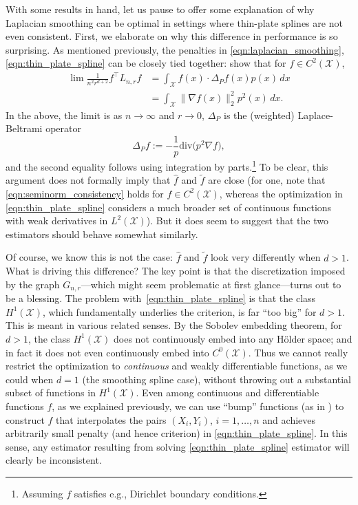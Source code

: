 \documentclass[twoside]{article}
\newcommand{\1}{\mathbf{1}}
\newcommand{\Lap}{L}
\newcommand{\Xset}{\mathcal{X}}
\newcommand{\Leb}{L}
\newcommand{\dive}{\mathrm{div}}
\newcommand{\wt}[1]{\widetilde{#1}}
\newcommand{\wh}[1]{\widehat{#1}}
\theoremstyle{definition}
\theoremstyle{remark}
\begin{document}
With some results in hand, let us pause to offer some explanation of why Laplacian smoothing can be optimal in settings where thin-plate splines are not even consistent. First, we elaborate on why this difference in performance is so surprising. As mentioned previously, the penalties in \eqref{eqn:laplacian_smoothing}, \eqref{eqn:thin_plate_spline} can be closely tied together: \citet{bousquet03} show that for $f \in C^2(\Xset)$, 
\begin{equation}
\label{eqn:seminorm_consistency}
\begin{aligned}
\lim \frac{1}{n^2 r^{d + 2}} f^\top \Lap_{n,r} f & = \int_{\Xset} f(x) \cdot \Delta_Pf(x) p(x) \,dx \\
& = \int_{\Xset} \|\nabla f(x)\|_2^2 p^2(x) \,dx.
\end{aligned}
\end{equation}
In the above, the limit is as $n \to \infty$ and $r \to 0$, $\Delta_P$ is the (weighted) Laplace-Beltrami operator
\begin{equation*}
\Delta_Pf := -\frac{1}{p} \dive\bigl(p^2\nabla f),
\end{equation*}
and the second equality follows using integration by parts.\footnote{Assuming $f$ satisfies e.g., Dirichlet boundary conditions.} To be clear, this argument does not formally imply that $\wh{f}$ and $\wt{f}$ are close (for one, note that \eqref{eqn:seminorm_consistency} holds for $f \in C^2(\Xset)$, whereas the optimization in \eqref{eqn:thin_plate_spline} considers a much broader set of continuous functions with weak derivatives in $\Leb^2(\Xset)$). But it does seem to suggest that the two estimators should behave somewhat similarly. 

Of course, we know this is not the case: $\wh{f}$ and $\wt{f}$ look very differently when $d > 1$. What is driving this difference? The key point is that the discretization imposed by the graph $G_{n,r}$---which might seem problematic at first glance---turns out to be a blessing. The problem with~\eqref{eqn:thin_plate_spline} is that the class $H^1(\Xset)$, which fundamentally underlies the criterion, is far ``too big'' for $d > 1$. This is meant in various related senses. By the Sobolev embedding theorem, for $d>1$, the class $H^1(\Xset)$ does not continuously embed into any H\"{o}lder space; and in fact it does not even continuously embed into $C^0(\Xset)$. Thus we cannot really restrict the optimization to \emph{continuous} and weakly differentiable functions, as we could when $d=1$ (the smoothing spline case), without throwing out a substantial subset of functions in $H^1(\Xset)$. Even among continuous and differentiable functions $f$, as we explained previously, we can use ``bump'' functions (as in \citet{green93}) to construct $f$ that interpolates the pairs $(X_i,Y_i)$, $i=1,\ldots,n$ and achieves arbitrarily small penalty (and hence criterion) in \eqref{eqn:thin_plate_spline}. In this sense, any estimator resulting from solving \eqref{eqn:thin_plate_spline} estimator will clearly be inconsistent. 
\end{document}
